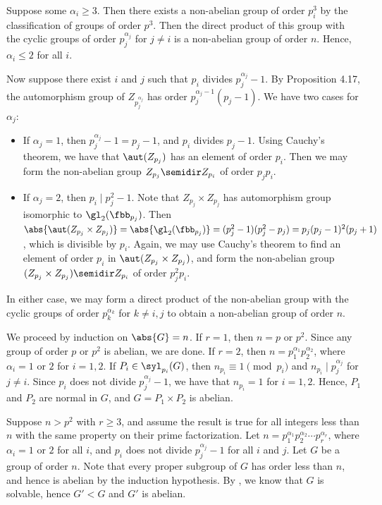 \begin{soliff}
    \rightimp Suppose some $\alpha_i \geq 3$.
    Then there exists a non-abelian group of order $p_i^3$ by the classification of groups of order $p^3$.
    Then the direct product of this group with the cyclic groups of order $p_j^{\alpha_j}$ for $j \neq i$ is a non-abelian group of order $n$.
    Hence, $\alpha_i \leq 2$ for all $i$.

    Now suppose there exist $i$ and $j$ such that $p_i$ divides $p_j^{\alpha_j} - 1$.
    By Proposition 4.17, the automorphism group of $Z_{p_j^{\alpha_j}}$ has order $p_j^{\alpha_j - 1}(p_j - 1)$.
    We have two cases for $\alpha_j$:
    \begin{itemize}
        \item If $\alpha_j = 1$, then $p_j^{\alpha_j} - 1 = p_j - 1$, and $p_i$ divides $p_j - 1$.
        Using Cauchy's theorem, we have that $\aut(Z_{p_j})$ has an element of order $p_i$.
        Then we may form the non-abelian group $Z_{p_j} \semidir Z_{p_i}$ of order $p_jp_i$.
        \item If $\alpha_j = 2$, then $p_i \mid p_j^2 - 1$.
        Note that $Z_{p_j} \times Z_{p_j}$ has automorphism group isomorphic to $\gl_2(\fbb_{p_j})$.
        Then $\abs{\aut(Z_{p_j} \times Z_{p_j})} = \abs{\gl_2(\fbb_{p_j})} = (p_j^2 - 1)(p_j^2 - p_j) = p_j(p_j - 1)^2(p_j + 1)$, which is divisible by $p_i$.
        Again, we may use Cauchy's theorem to find an element of order $p_i$ in $\aut(Z_{p_j} \times Z_{p_j})$, and form the non-abelian group $(Z_{p_j} \times Z_{p_j}) \semidir Z_{p_i}$ of order $p_j^2p_i$.
    \end{itemize}
    In either case, we may form a direct product of the non-abelian group with the cyclic groups of order $p_k^{\alpha_k}$ for $k \neq i, j$ to obtain a non-abelian group of order $n$.

    \leftimp We proceed by induction on $\abs{G} = n$.
    If $r = 1$, then $n = p$ or $p^2$.
    Since any group of order $p$ or $p^2$ is abelian, we are done.
    If $r = 2$, then $n = p_1^{\alpha_1}p_2^{\alpha_2}$, where $\alpha_i = 1$ or $2$ for $i = 1, 2$.
    If $P_i \in \syl_{p_i}(G)$, then $n_{p_i} \equiv 1 \pmod p_i$ and $n_{p_i} \mid p_j^{\alpha_j}$ for $j \neq i$.
    Since $p_i$ does not divide $p_j^{\alpha_j} - 1$, we have that $n_{p_i} = 1$ for $i = 1, 2$.
    Hence, $P_1$ and $P_2$ are normal in $G$, and $G = P_1 \times P_2$ is abelian.

    Suppose $n > p^2$ with $r \geq 3$, and assume the result is true for all integers less than $n$ with the same property on their prime factorization.
    Let $n = p_1^{\alpha_1} p_2^{\alpha_2} \cdots p_r^{\alpha_r}$, where $\alpha_i = 1$ or $2$ for all $i$, and $p_i$ does not divide $p_j^{\alpha_j} - 1$ for all $i$ and $j$.
    Let $G$ be a group of order $n$.
    Note that every proper subgroup of $G$ has order less than $n$, and hence is abelian by the induction hypothesis.
    By , we know that $G$ is solvable, hence $G' < G$ and $G'$ is abelian.


\end{soliff}
